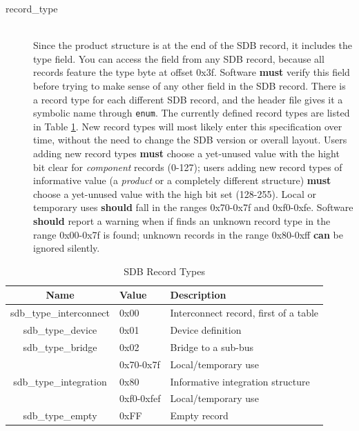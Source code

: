 \documentclass[a4paper, 12pt]{article}
\begin{document}
\begin{description}
\item[record\_type] \hfill \\
Since the product structure is at the end of the SDB record, it includes the
type field. You can access the field from any SDB record, because all records feature
the type byte at offset 0x3f.  Software \textbf{must} verify this field before trying to
make sense of any other field in the SDB record.
There is a record type for each different
SDB record, and the header file gives it a symbolic name through \texttt{enum}.
The currently defined record types are listed in Table \ref{record_type}.  New
record types will most likely enter this specification over time, without the need
to change the SDB version or overall layout.  Users adding new record types \textbf{must}
choose a yet-unused value with the hight bit clear for \textit{component} records (0-127);
users adding new record types of informative value (a \textit{product} or a completely
different structure) \textbf{must} choose a yet-unused value with the high bit set (128-255).
Local or temporary uses \textbf{should} fall in the ranges 0x70-0x7f and 0xf0-0xfe.
Software \textbf{should} report a warning when if finds an
unknown record type in the range 0x00-0x7f is found; unknown records in the range 0x80-0xff
\textbf{can} be ignored silently.
\end{description}

\begin{center}
  \begin{savenotes}
    \begin{table}[!ht]\footnotesize
      \caption{SDB Record Types}\label{record_type}\centering
        \begin{tabular}{| c | l | p{6cm} |} \hline
        Name & Value & Description \\ \hline
        sdb\_type\_interconnect & 0x00 & Interconnect record, first of a table \\ \hline
        sdb\_type\_device & 0x01 & Device definition \\ \hline
        sdb\_type\_bridge & 0x02 & Bridge to a sub-bus \\ \hline
        & 0x70-0x7f & Local/temporary use \\ \hline
        sdb\_type\_integration & 0x80 & Informative integration structure \\ \hline
        & 0xf0-0xfef & Local/temporary use \\ \hline
        sdb\_type\_empty & 0xFF & Empty record \\ \hline
        \end{tabular}
    \end{table}
  \end{savenotes}
\end{center}
\end{document}
